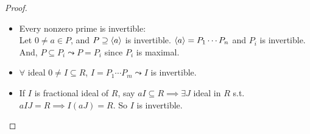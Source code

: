 \begin{theorem}
\begin{proof}
\begin{description}
\begin{itemize}
        \item Every nonzero prime is invertible: \\
          Let $0 \neq a \in P$, and $P \supseteq \langle a\rangle$ is invertible. $\langle a\rangle
            = P_1 \cdots P_n$ and $P_i$ is invertible. And, $P \subseteq P_i 
            \leadsto P = P_i$ since $P_i$ is maximal.
        \item $\forall$ ideal $0 \neq I \subseteq R$, $I = P_1 \cdots P_m \leadsto 
          I$ is invertible.
        \item If $I$ is fractional ideal of $R$, say $aI \subseteq R \implies
          \exists J$ ideal in $R$ s.t. $aIJ = R \implies I(aJ) = R$. So $I$ is
            invertible.
        \end{itemize}
  \end{description}
  \end{proof}
\end{theorem}
